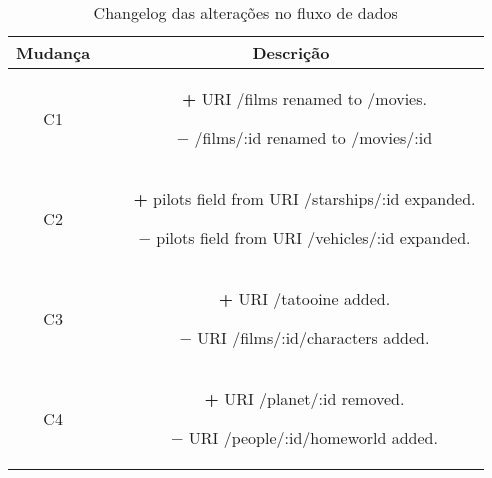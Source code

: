\begin{table}[H]
  \centering
  \begin{tabular}{|c|c|}
    \hline
    Mudança & Descrição \\
    \hline
    C1 & \begin{minipage}[t]{0.4\textwidth}
      \begin{itemize}
        \item[\textbf{+}] URI /films renamed to /movies.
        \item[\textbf{$-$}] /films/:id renamed to /movies/:id
      \end{itemize}
    \end{minipage} \\
    \hline
    C2 & \begin{minipage}[t]{0.4\textwidth}
      \begin{itemize}
        \item[\textbf{+}] pilots field from URI /starships/:id expanded.
        \item[\textbf{$-$}] pilots field from URI /vehicles/:id expanded.
      \end{itemize}
    \end{minipage} \\
    \hline
    C3 & \begin{minipage}[t]{0.4\textwidth}
      \begin{itemize}
        \item[\textbf{+}] URI /tatooine added.
        \item[\textbf{$-$}] URI /films/:id/characters added.
      \end{itemize}
    \end{minipage} \\
    \hline
    C4 & \begin{minipage}[t]{0.4\textwidth}
      \begin{itemize}
        \item[\textbf{+}] URI /planet/:id removed.
        \item[\textbf{$-$}] URI /people/:id/homeworld added.
      \end{itemize}
    \end{minipage} \\
    \hline
  \end{tabular}
  \caption{Changelog das alterações no fluxo de dados}
\end{table}

